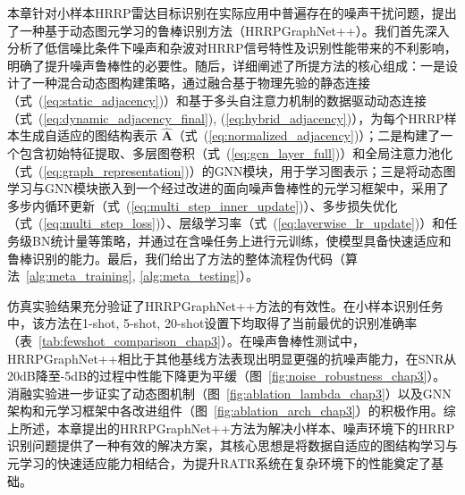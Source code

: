 本章针对小样本HRRP雷达目标识别在实际应用中普遍存在的噪声干扰问题，提出了一种基于动态图元学习的鲁棒识别方法（HRRPGraphNet++）。我们首先深入分析了低信噪比条件下噪声和杂波对HRRP信号特性及识别性能带来的不利影响，明确了提升噪声鲁棒性的必要性。随后，详细阐述了所提方法的核心组成：一是设计了一种混合动态图构建策略，通过融合基于物理先验的静态连接（式~(\ref{eq:static_adjacency})）和基于多头自注意力机制的数据驱动动态连接（式~(\ref{eq:dynamic_adjacency_final}), (\ref{eq:hybrid_adjacency})），为每个HRRP样本生成自适应的图结构表示 $\hat{\mathbf{A}}$（式~(\ref{eq:normalized_adjacency})）；二是构建了一个包含初始特征提取、多层图卷积（式~(\ref{eq:gcn_layer_full})）和全局注意力池化（式~(\ref{eq:graph_representation})）的GNN模块，用于学习图表示；三是将动态图学习与GNN模块嵌入到一个经过改进的面向噪声鲁棒性的元学习框架中，采用了多步内循环更新（式~(\ref{eq:multi_step_inner_update})）、多步损失优化（式~(\ref{eq:multi_step_loss})）、层级学习率（式~(\ref{eq:layerwise_lr_update})）和任务级BN统计量等策略，并通过在含噪任务上进行元训练，使模型具备快速适应和鲁棒识别的能力。最后，我们给出了方法的整体流程伪代码（算法~\ref{alg:meta_training}, \ref{alg:meta_testing}）。

仿真实验结果充分验证了HRRPGraphNet++方法的有效性。在小样本识别任务中，该方法在1-shot, 5-shot, 20-shot设置下均取得了当前最优的识别准确率（表~\ref{tab:fewshot_comparison_chap3}）。在噪声鲁棒性测试中，HRRPGraphNet++相比于其他基线方法表现出明显更强的抗噪声能力，在SNR从20dB降至-5dB的过程中性能下降更为平缓（图~\ref{fig:noise_robustness_chap3}）。消融实验进一步证实了动态图机制（图~\ref{fig:ablation_lambda_chap3}）以及GNN架构和元学习框架中各改进组件（图~\ref{fig:ablation_arch_chap3}）的积极作用。综上所述，本章提出的HRRPGraphNet++方法为解决小样本、噪声环境下的HRRP识别问题提供了一种有效的解决方案，其核心思想是将数据自适应的图结构学习与元学习的快速适应能力相结合，为提升RATR系统在复杂环境下的性能奠定了基础。
